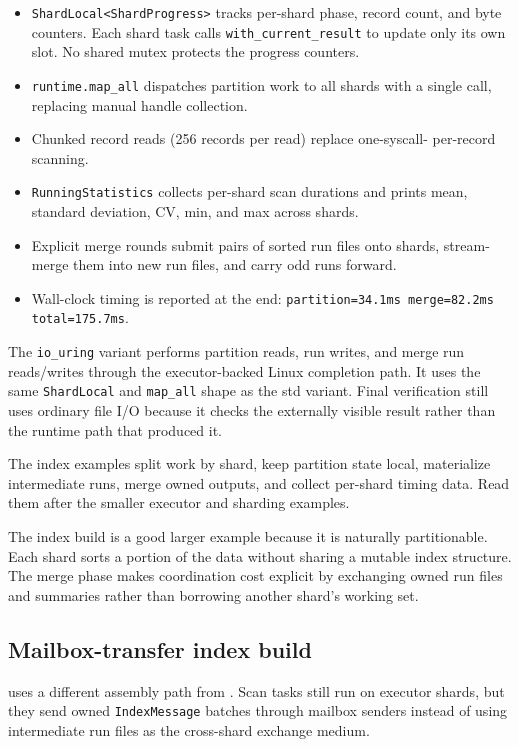 \begin{itemize}
    \item \texttt{ShardLocal<ShardProgress>} tracks per-shard phase,
          record count, and byte counters. Each shard task calls
          \texttt{with\_current\_result} to update only its own slot.
          No shared mutex protects the progress counters.
    \item \texttt{runtime.map\_all} dispatches partition work to all
          shards with a single call, replacing manual handle collection.
    \item Chunked record reads (256 records per read) replace one-syscall-
          per-record scanning.
    \item \texttt{RunningStatistics} collects per-shard scan durations and
          prints mean, standard deviation, CV, min, and max across shards.
    \item Explicit merge rounds submit pairs of sorted run files onto shards,
          stream-merge them into new run files, and carry odd runs forward.
    \item Wall-clock timing is reported at the end:
          \texttt{partition=34.1ms merge=82.2ms total=175.7ms}.
\end{itemize}

The \texttt{io\_uring} variant performs partition reads, run writes, and merge
run reads/writes through the executor-backed Linux completion path. It uses the
same \texttt{ShardLocal} and \texttt{map\_all} shape as the std variant. Final
verification still uses ordinary file I/O because it checks the externally
visible result rather than the runtime path that produced it.

The index examples split work by shard, keep partition state local, materialize
intermediate runs, merge owned outputs, and collect per-shard timing data. Read
them after the smaller executor and sharding examples.

The index build is a good larger example because it is naturally partitionable.
Each shard sorts a portion of the data without sharing a mutable index
structure. The merge phase makes coordination cost explicit by exchanging owned
run files and summaries rather than borrowing another shard's working set.

\subsection{Mailbox-transfer index build}

 uses a different assembly path from
. Scan tasks still run on executor shards,
but they send owned \texttt{IndexMessage} batches through
mailbox senders instead of using intermediate run files as the cross-shard exchange medium.

